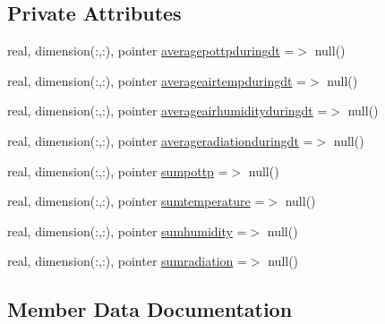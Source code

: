 \subsection*{Private Attributes}
\begin{DoxyCompactItemize}
\item 
real, dimension(\+:,\+:), pointer \mbox{\hyperlink{structmodulevegetation_1_1t__integration_a76423a0a194efda2eb8bb6065b557221}{averagepottpduringdt}} =$>$ null()
\item 
real, dimension(\+:,\+:), pointer \mbox{\hyperlink{structmodulevegetation_1_1t__integration_adfa0eee7eea06d40f59b326a89040523}{averageairtempduringdt}} =$>$ null()
\item 
real, dimension(\+:,\+:), pointer \mbox{\hyperlink{structmodulevegetation_1_1t__integration_a0c4baff663cdd8a29e10a79096486c29}{averageairhumidityduringdt}} =$>$ null()
\item 
real, dimension(\+:,\+:), pointer \mbox{\hyperlink{structmodulevegetation_1_1t__integration_a899b185d9ff3ec21ae98c82042d3ef14}{averageradiationduringdt}} =$>$ null()
\item 
real, dimension(\+:,\+:), pointer \mbox{\hyperlink{structmodulevegetation_1_1t__integration_a77e33fd81a20d73cfd414bb678fce632}{sumpottp}} =$>$ null()
\item 
real, dimension(\+:,\+:), pointer \mbox{\hyperlink{structmodulevegetation_1_1t__integration_a7411474187f1475ac68e7477d77cad1e}{sumtemperature}} =$>$ null()
\item 
real, dimension(\+:,\+:), pointer \mbox{\hyperlink{structmodulevegetation_1_1t__integration_a514316c78fe81d0a70404003fb9ceff1}{sumhumidity}} =$>$ null()
\item 
real, dimension(\+:,\+:), pointer \mbox{\hyperlink{structmodulevegetation_1_1t__integration_a4100d7ea0ca8924c8d5cd923408f8b38}{sumradiation}} =$>$ null()
\end{DoxyCompactItemize}


\subsection{Member Data Documentation}
\mbox{\label{structmodulevegetation_1_1t__integration_a0c4baff663cdd8a29e10a79096486c29}} 
